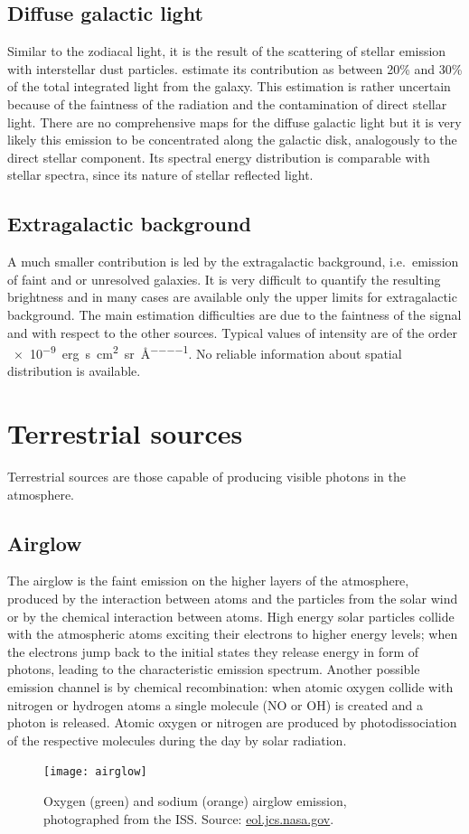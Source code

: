 \documentclass[a4paper, titlepage, 10pt]{book}
\begin{document}
\subsection{Diffuse galactic light}
Similar to the zodiacal light, it is the result of the scattering of stellar emission with interstellar dust particles. \cite{leinert19981997} estimate its contribution as between 20\% and 30\% of the total integrated light from the galaxy. This estimation is rather uncertain because of the faintness of the radiation and the contamination of direct stellar light. There are no comprehensive maps for the diffuse galactic light but it is very likely this emission to be concentrated along the galactic disk, analogously to the direct stellar component. Its spectral energy distribution is comparable with stellar spectra, since its nature of stellar reflected light.

\subsection{Extragalactic background}
A much smaller contribution is led by the extragalactic background, i.e.\ emission of faint and or unresolved galaxies. It is very difficult to quantify the resulting brightness and in many cases are available only the upper limits for extragalactic background. The main estimation difficulties are due to the faintness of the signal and with respect to the other sources. Typical values of intensity are of the order \SI{e-9}{erg\per\second \per\centi\metre\squared \per\steradian\per\angstrom}. No reliable information about spatial distribution is available.

\section{Terrestrial sources}
Terrestrial sources are those capable of producing visible photons in the atmosphere.

\subsection{Airglow}
The airglow is the faint emission on the higher layers of the atmosphere, produced by the interaction between atoms and the particles from the solar wind or by the chemical interaction between atoms. High energy solar particles collide with the atmospheric atoms exciting their electrons to higher energy levels; when the electrons jump back to the initial states they release energy in form of photons, leading to the characteristic emission spectrum. Another possible emission channel is by chemical recombination: when atomic oxygen collide with nitrogen or hydrogen atoms a single molecule (NO or OH) is created and a photon is released. Atomic oxygen or nitrogen are produced by photodissociation of the respective molecules during the day by solar radiation.
\begin{figure}
	\centering
	\texttt{[image: airglow]}
	\caption{Oxygen (green) and sodium (orange) airglow emission, photographed from the ISS. Source: \href{https://eol.jsc.nasa.gov/SearchPhotos/photo.pl?mission=ISS043&roll=E&frame=143486}{eol.jcs.nasa.gov}.\label{fig:airglow}}
\end{figure}
\end{document}
